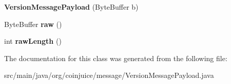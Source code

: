\begin{DoxyCompactItemize}
\item 
\hypertarget{classorg_1_1coinjuice_1_1message_1_1_version_message_payload_acb5efb113ad1710e6f54fa1440cc0fad}{{\bfseries Version\-Message\-Payload} (Byte\-Buffer b)}\label{classorg_1_1coinjuice_1_1message_1_1_version_message_payload_acb5efb113ad1710e6f54fa1440cc0fad}

\item 
\hypertarget{classorg_1_1coinjuice_1_1message_1_1_version_message_payload_a80297391afe23ae6b29ff0e41ad98918}{Byte\-Buffer {\bfseries raw} ()}\label{classorg_1_1coinjuice_1_1message_1_1_version_message_payload_a80297391afe23ae6b29ff0e41ad98918}

\item 
\hypertarget{classorg_1_1coinjuice_1_1message_1_1_version_message_payload_ac2eb8a0c38eb70e51eacb5794389153f}{int {\bfseries raw\-Length} ()}\label{classorg_1_1coinjuice_1_1message_1_1_version_message_payload_ac2eb8a0c38eb70e51eacb5794389153f}

\end{DoxyCompactItemize}


The documentation for this class was generated from the following file\-:\begin{DoxyCompactItemize}
\item 
src/main/java/org/coinjuice/message/Version\-Message\-Payload.\-java\end{DoxyCompactItemize}
